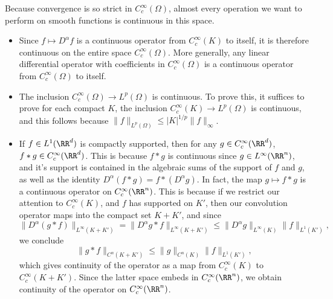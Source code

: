 Because convergence is so strict in $C_c^\infty(\Omega)$, almost every operation we want to perform on smooth functions is continuous in this space.
%
\begin{itemize}
    \item Since $f \mapsto D^\alpha f$ is a continuous operator from $C_c^\infty(K)$ to itself, it is therefore continuous on the entire space $C_c^\infty(\Omega)$. More generally, any linear differential operator with coefficients in $C_c^\infty(\Omega)$ is a continuous operator from $C_c^\infty(\Omega)$ to itself.

    \item The inclusion $C_c^\infty(\Omega) \to L^p(\Omega)$ is continuous. To prove this, it suffices to prove for each compact $K$, the inclusion $C_c^\infty(K) \to L^p(\Omega)$ is continuous, and this follows because $\| f \|_{L^p(\Omega)} \leq |K|^{1/p} \| f \|_\infty$.

    \item If $f \in L^1(\RR^d)$ is compactly supported, then for any $g \in C_c^\infty(\RR^d)$, $f * g \in C_c^\infty(\RR^d)$. This is because $f * g$ is continuous since $g \in L^\infty(\RR^n)$, and it's support is contained in the algebraic sums of the support of $f$ and $g$, as well as the identity $D^\alpha(f * g) = f * (D^\alpha g)$. In fact, the map $g \mapsto f * g$ is a continuous operator on $C_c^\infty(\RR^n)$. This is because if we restrict our attention to $C_c^\infty(K)$, and $f$ has supported on $K'$, then our convolution operator maps into the compact set $K+K'$, and since
    \[ \| D^\alpha (g * f) \|_{L^\infty(K + K')} = \| D^\alpha g * f \|_{L^\infty(K + K')} \leq \| D^\alpha g \|_{L^\infty(K)} \| f \|_{L^1(K')}, \]
    we conclude
    \[ \| g * f \|_{C^n(K+K')} \leq \| g \|_{C^n(K)} \| f \|_{L^1(K')}, \]
    which gives continuity of the operator as a map from $C_c^\infty(K)$ to $C_c^\infty(K+K')$. Since the latter space embeds in $C_c^\infty(\RR^n)$, we obtain continuity of the operator on $C_c^\infty(\RR^n)$.
\end{itemize}

